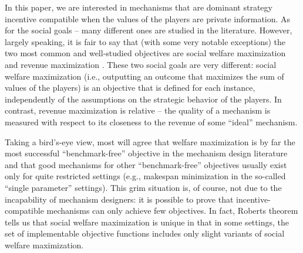 \documentclass{theoretics}
\begin{document}
In this paper, we are interested in mechanisms that are dominant strategy incentive compatible when the values of the players are private information. As for the social goals -- many different ones are studied in the literature. However, largely speaking, it is fair to say that (with some very notable exceptions) the two most common and well-studied objectives are social welfare maximization \cite{Vic61,Cla71,Gro73} and revenue maximization \cite{Mye81}. These two social goals are very different: social welfare maximization (i.e., outputting an outcome that maximizes the sum of values of the players) is an objective that is defined for each instance, independently of the assumptions on the strategic behavior of the players. In contrast, revenue maximization is relative -- the quality of a mechanism is measured with respect to its closeness to the revenue of some ``ideal'' mechanism.

Taking a bird's-eye view, most will agree that welfare maximization is by far the most successful ``benchmark-free'' objective in the mechanism design literature and that good mechanisms for other ``benchmark-free'' objectives usually exist only for quite restricted settings (e.g., makespan minimization in the so-called ``single parameter'' settings). This grim situation is, of course, not due to the incapability of mechanism designers: it is possible to prove that incentive-compatible mechanisms can only achieve few objectives. In fact, Roberts theorem \cite{Rob79} tells us that social welfare maximization is unique in that in some settings, the set of implementable objective functions includes only slight variants of social welfare maximization.
\end{document}
